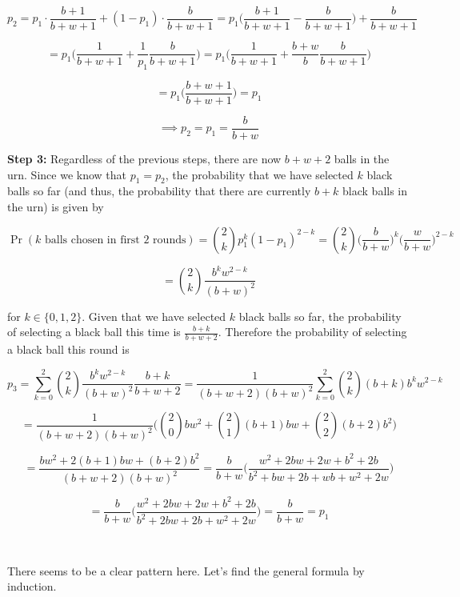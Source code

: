 \documentclass{article}
\begin{document}
\[
p_2 = p_1 \cdot \frac{b + 1}{b + w + 1} + (1 - p_1) \cdot \frac{b}{b + w + 1} = p_1 \bigg(\frac{b + 1}{b + w + 1} -  \frac{b}{b + w + 1} \bigg) + \frac{b}{b + w + 1}
\]

\[
= p_1\bigg( \frac{1}{b + w + 1} + \frac{1}{p_1}\frac{b}{b + w + 1} \bigg) = p_1\bigg( \frac{1}{b + w + 1} + \frac{b + w}{b}\frac{b}{b + w + 1} \bigg) 
\]

\[
= p_1 \bigg(\frac{b + w + 1}{b + w + 1} \bigg) = p_1
\]



\[
\implies p_2 = p_1 =  \frac{b}{b+w}
\]

\textbf{Step 3:} Regardless of the previous steps, there are now \(b + w + 2\) balls in the urn. Since we know that \(p_1 = p_2\), the probability that we have selected \(k\) black balls so far (and thus, the probability that there are currently \(b + k\) black balls in the urn) is given by

\[
\Pr(k \text{ balls chosen in first 2 rounds}) = \binom{2}{k}p_1^k(1 - p_1)^{2 - k} = \binom{2}{k} \bigg(\frac{b}{b+w} \bigg)^k \bigg(\frac{w}{b+w} \bigg)^{2 - k}
\]

\[
= \binom{2}{k}\frac{b^k w^{2-k}}{(b+w)^2} 
\]

for \(k \in \{0, 1, 2\}\). Given that we have selected \(k\) black balls so far, the probability of selecting a black ball this time is \(\frac{b + k}{b + w + 2}\). Therefore the probability of selecting a black ball this round is

\[
p_3 = \sum_{k=0}^2 \binom{2}{k}\frac{b^k w^{2-k}}{(b+w)^2} \frac{b + k}{b + w + 2} = \frac{1}{(b+w+2)(b+w)^2} \sum_{k=0}^2 \binom{2}{k} (b+k)b^kw^{2-k}
\]

\[
= \frac{1}{(b+w+2)(b+w)^2} \bigg( \binom{2}{0}bw^2 + \binom{2}{1}(b+1)bw + \binom{2}{2}(b+2)b^2 \bigg)
\]

\[
= \frac{bw^2 + 2(b+1)bw + (b+2)b^2}{(b+w+2)(b+w)^2} = \frac{b}{b+w} \bigg(\frac{w^2 + 2bw + 2w + b^2 + 2b}{b^2 + bw + 2b + wb + w^2 + 2w}\bigg)
\]

\[
=\frac{b}{b+w} \bigg( \frac{w^2 + 2bw + 2w + b^2 + 2b}{b^2 + 2bw + 2b + w^2 + 2w} \bigg) = \frac{b}{b+w} = p_1
\]

\

There seems to be a clear pattern here. Let's find the general formula by induction.
\end{document}
